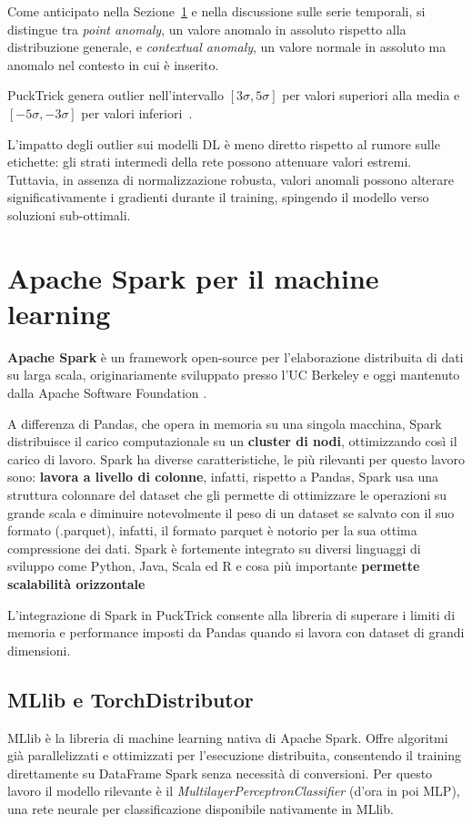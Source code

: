 \documentclass[../main.tex]{subfiles}
\begin{document}
Come anticipato nella Sezione~\ref{section:DifferenzaTraApacheEPandas}
e nella discussione sulle serie temporali, si distingue tra
\textit{point anomaly}, un valore anomalo in assoluto rispetto alla
distribuzione generale, e \textit{contextual anomaly}, un valore normale
in assoluto ma anomalo nel contesto in cui è inserito. 

PuckTrick genera outlier nell'intervallo $[3\sigma, 5\sigma]$ per valori superiori alla media e $[-5\sigma, -3\sigma]$ per valori inferiori~\cite{agostini2025pucktricklibrarymakingsynthetic}.

L'impatto degli outlier sui modelli DL è meno diretto rispetto al rumore sulle etichette: gli strati intermedi della rete possono attenuare valori estremi. Tuttavia, in assenza di normalizzazione robusta, valori anomali possono alterare significativamente i gradienti durante il training, spingendo il modello verso soluzioni sub-ottimali.


\section{Apache Spark per il machine learning}
\label{section:DifferenzaTraApacheEPandas}
\textbf{Apache Spark} è un framework open-source per l'elaborazione distribuita di dati su larga scala, originariamente sviluppato presso l'UC Berkeley e oggi mantenuto dalla Apache Software Foundation \cite{sparkApache}. 

A differenza di Pandas, che opera in memoria su una singola macchina, Spark distribuisce il carico computazionale su un \textbf{cluster di nodi}, ottimizzando così il carico di lavoro. Spark ha diverse caratteristiche, le più rilevanti per questo lavoro sono: \textbf{lavora a livello di colonne}, infatti, rispetto a Pandas, Spark usa una struttura colonnare del dataset che gli permette di ottimizzare le operazioni su grande scala e diminuire notevolmente il peso di un dataset se salvato con il suo formato (.parquet), infatti, il formato parquet è notorio per la sua ottima compressione dei dati. Spark è fortemente integrato su diversi linguaggi di sviluppo come Python, Java, Scala ed R e cosa più importante \textbf{permette scalabilità orizzontale}

L'integrazione di Spark in PuckTrick consente alla libreria di superare i limiti di memoria e performance imposti da Pandas quando si lavora con dataset di grandi dimensioni.

\subsection{MLlib e TorchDistributor}
MLlib è la libreria di machine learning nativa di Apache Spark. Offre algoritmi già parallelizzati e ottimizzati per l'esecuzione distribuita, consentendo il training direttamente su DataFrame Spark senza necessità di conversioni. Per questo lavoro il modello rilevante è il \textit{MultilayerPerceptronClassifier} (d'ora in poi MLP), una rete neurale per classificazione disponibile nativamente in MLlib.
\end{document}

